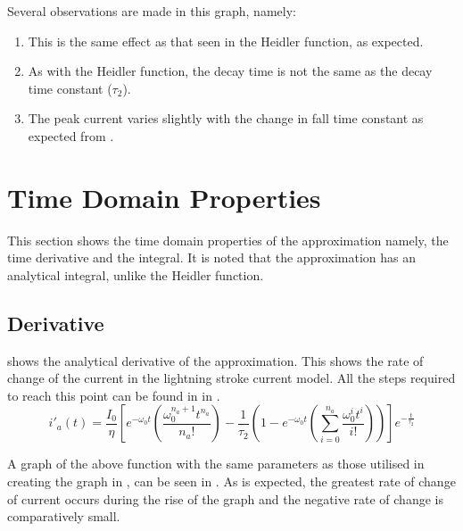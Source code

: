Several observations are made in this graph, namely:
\begin{enumerate}
    \item This is the same effect as that seen in the Heidler function, as expected.
    \item As with the Heidler function, the decay time is not the same as the decay time constant ($\tau_2$).
    \item The peak current varies slightly with the change in fall time constant as expected from .
\end{enumerate}


\section{Time Domain Properties}
\label{sec:approx_time_domain_analysis}
This section shows the time domain properties of the approximation namely, the time derivative and the integral. It is noted that the approximation has an analytical integral, unlike the Heidler function.

\subsection{Derivative}
\label{sub:approx_derivative}
 shows the analytical derivative of the approximation. This shows the rate of change of the current in the lightning stroke current model. All the steps required to reach this point can be found in  in .
\begin{equation}
    i'_{a} \left( t \right) = \frac{I_0}{\eta} \left [ e^{-\omega_0 t} \left ( \frac{\omega_0^{n_a+1} t^{n_a}}{n_a!} \right ) - \frac{1}{\tau_2} \left ( 1 - e^{-\omega_0 t}\left ( \sum_{i=0}^{n_a} \frac{\omega_0^{i} t^i}{i!} \right ) \right ) \right ] e^{-\frac{t}{\tau_2}}
    \label{eqn:approx_deriv}
\end{equation}

A graph of the above function with the same parameters as those utilised in creating the graph in , can be seen in .
As is expected, the greatest rate of change of current occurs during the rise of the graph and the negative rate of change is comparatively small.

